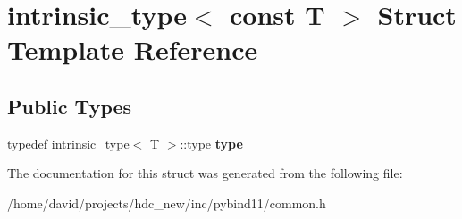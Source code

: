 \hypertarget{structintrinsic__type_3_01const_01_t_01_4}{}\section{intrinsic\+\_\+type$<$ const T $>$ Struct Template Reference}
\label{structintrinsic__type_3_01const_01_t_01_4}
\subsection*{Public Types}
\begin{DoxyCompactItemize}
\item 
typedef \hyperlink{structintrinsic__type}{intrinsic\+\_\+type}$<$ T $>$\+::type {\bfseries type}\hypertarget{structintrinsic__type_3_01const_01_t_01_4_a977cbccc3da541d467acda18abd63a74}{}\label{structintrinsic__type_3_01const_01_t_01_4_a977cbccc3da541d467acda18abd63a74}

\end{DoxyCompactItemize}


The documentation for this struct was generated from the following file\+:\begin{DoxyCompactItemize}
\item 
/home/david/projects/hdc\+\_\+new/inc/pybind11/common.\+h\end{DoxyCompactItemize}
